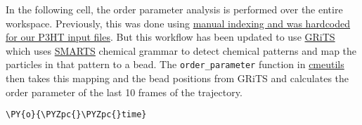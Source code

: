     In the following cell, the order parameter analysis is performed over
the entire workspace. Previously, this was done using
\href{https://bitbucket.org/cmelab/evan_analysis_scripts/src/master/order_over_time.py}{manual
indexing and was hardcoded for our P3HT input files}. But this workflow
has been updated to use \href{https://github.com/cmelab/grits}{GRiTS}
which uses
\href{https://www.daylight.com/dayhtml/doc/theory/theory.smarts.html}{SMARTS}
chemical grammar to detect chemical patterns and map the particles in
that pattern to a bead. The \texttt{order\_parameter} function in
\href{https://github.com/cmelab/cmeutils}{cmeutils} then takes this
mapping and the bead positions from GRiTS and calculates the order
parameter of the last 10 frames of the trajectory.

    \begin{tcolorbox}[breakable, size=fbox, boxrule=1pt, pad at break*=1mm,colback=cellbackground, colframe=cellborder]
\begin{Verbatim}[commandchars=\\\{\}]
\PY{o}{\PYZpc{}\PYZpc{}time}


\end{Verbatim}
\end{tcolorbox}
